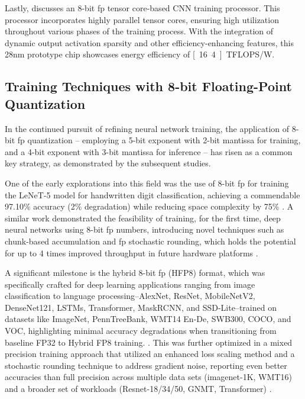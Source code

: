 Lastly, \cite{venkataramanaiah202228nm} discusses an 8-bit \gls{fp} tensor core-based CNN training processor. This processor incorporates highly parallel tensor cores, ensuring high utilization throughout various phases of the training process. With the integration of dynamic output activation sparsity and other efficiency-enhancing features, this 28nm prototype chip showcases energy efficiency of \unit[16.4]{TFLOPS/W}.



\subsection{Training Techniques with 8-bit Floating-Point Quantization}
In the continued pursuit of refining neural network training, the application of 8-bit \gls{fp} quantization -- employing a 5-bit exponent with 2-bit mantissa for training, and a 4-bit exponent with 3-bit mantissa for inference -- has risen as a common key strategy, as demonstrated by the subsequent studies.

One of the early explorations into this field was the use of 8-bit \gls{fp} for training the LeNeT-5 model for handwritten digit classification, achieving a commendable 97.10\% accuracy (2\% degradation) while reducing space complexity by 75\% \cite{gallus2018handwritten}. A similar work demonstrated the feasibility of training, for the first time, deep neural networks using 8-bit \gls{fp} numbers, introducing novel techniques such as chunk-based accumulation and \gls{fp} stochastic rounding, which holds the potential for up to 4 times improved throughput in future hardware platforms \cite{wang2018training}.

A significant milestone is the hybrid 8-bit \gls{fp} (HFP8) format, which was specifically crafted for deep learning applications ranging from image classification to language processing--AlexNet, ResNet, MobileNetV2, DenseNet121, LSTMs, Transformer, MaskRCNN, and SSD-Lite--trained on datasets like ImageNet, PennTreeBank, WMT14 En-De, SWB300, COCO, and VOC, highlighting minimal accuracy degradations when transitioning from baseline FP32 to Hybrid FP8 training. \cite{sun2019hybrid}. This was further optimized in a mixed precision training approach that utilized an enhanced loss scaling method and a stochastic rounding technique to address gradient noise, reporting even better accuracies than full precision across multiple data sets (imagenet-1K, WMT16) and a broader set of workloads (Resnet-18/34/50, GNMT, Transformer) \cite{mellempudi2019mixed}.

